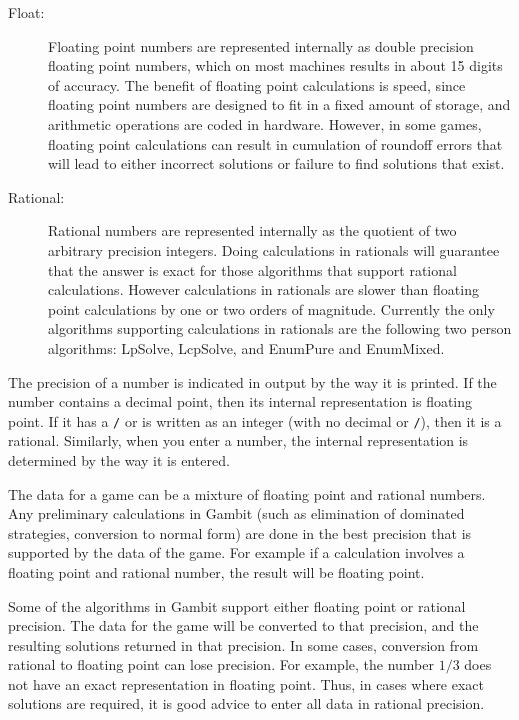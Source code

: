 \begin{description}
\item[Float:] Floating point numbers are represented internally as
double precision floating point numbers, which on most machines
results in about 15 digits of accuracy.  The benefit of floating point
calculations is speed, since floating point numbers are designed to
fit in a fixed amount of storage, and arithmetic operations are coded
in hardware.  However, in some games, floating point calculations can
result in cumulation of roundoff errors that will lead to either
incorrect solutions or failure to find solutions that exist.
\item[Rational:] Rational numbers are represented internally as the
quotient of two arbitrary precision integers.  Doing calculations in
rationals will guarantee that the answer is exact for those algorithms
that support rational calculations.  However calculations in rationals
are slower than floating point calculations by one or two orders of
magnitude.  Currently the only algorithms supporting calculations in
rationals are the following two person algorithms: LpSolve, LcpSolve,
and EnumPure and EnumMixed.
\end{description}

The precision of a number is indicated in output by the way it is
printed.  If the number contains a decimal point, then its internal
representation is floating point.  If it has a \verb+/+ or is written
as an integer (with no decimal or \verb+/+), then it is a rational.
Similarly, when you enter a number, the internal representation is
determined by the way it is entered.

The data for a game can be a mixture of floating point and rational
numbers.  Any preliminary calculations in Gambit (such as elimination
of dominated strategies, conversion to normal form) are done in the
best precision that is supported by the data of the game.  For example
if a calculation involves a floating point and rational number, the
result will be floating point.

Some of the algorithms in Gambit support either floating point or
rational precision. The data for the game will be converted to that
precision, and the resulting solutions returned in that precision.  In
some cases, conversion from rational to floating point can lose
precision.  For example, the number $1/3$ does not have an exact
representation in floating point.  Thus, in cases where exact
solutions are required, it is good advice to enter all data in
rational precision.

